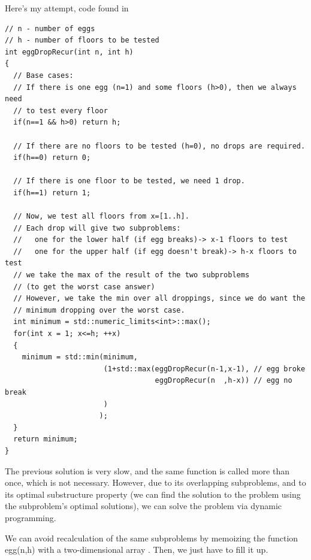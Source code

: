 Here's my attempt, code found in\\
\begin{lstlisting}[style=raycppnewsnippet]
// n - number of eggs
// h - number of floors to be tested
int eggDropRecur(int n, int h)
{
  // Base cases:
  // If there is one egg (n=1) and some floors (h>0), then we always need
  // to test every floor
  if(n==1 && h>0) return h;

  // If there are no floors to be tested (h=0), no drops are required.
  if(h==0) return 0;

  // If there is one floor to be tested, we need 1 drop.
  if(h==1) return 1;

  // Now, we test all floors from x=[1..h].
  // Each drop will give two subproblems:
  //   one for the lower half (if egg breaks)-> x-1 floors to test
  //   one for the upper half (if egg doesn't break)-> h-x floors to test
  // we take the max of the result of the two subproblems 
  // (to get the worst case answer)
  // However, we take the min over all droppings, since we do want the 
  // minimum dropping over the worst case.
  int minimum = std::numeric_limits<int>::max();
  for(int x = 1; x<=h; ++x)
  {
    minimum = std::min(minimum,
                       (1+std::max(eggDropRecur(n-1,x-1), // egg broke
                                   eggDropRecur(n  ,h-x)) // egg no break
                       )
                      );
  }
  return minimum;
}
\end{lstlisting}

\qasepline{}


The previous solution is very slow, and the same function is called more
than once, which is not necessary. However, due to its overlapping
subproblems, and to its optimal substructure property (we can find the
solution to the problem using the subproblem's optimal solutions), we can
solve the problem via dynamic programming.

We can avoid recalculation of the same subproblems by memoizing the function
egg(n,h) with a two-dimensional array . Then, we just
have to fill it up.

